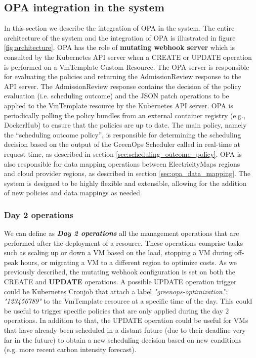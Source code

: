 \subsection{OPA integration in the system}

In this section we describe the integration of OPA in the system.
The entire architecture of the system and the integration of OPA is illustrated in figure \ref{fig:architecture}.
OPA has the role of \textbf{mutating webhook server} which is consulted by the Kubernetes API server when a CREATE or UPDATE operation is performed on a VmTemplate Custom Resource.
The OPA server is responsible for evaluating the policies and returning the AdmissionReview response to the API server.
The AdmissionReview response contains the decision of the policy evaluation (i.e. scheduling outcome) and the JSON patch operations to be applied to the VmTemplate resource by the Kubernetes API server.
OPA is periodically polling the policy bundles from an external container registry (e.g., DockerHub) to ensure that the policies are up to date.
The main policy, namely the ``scheduling outcome policy'', is responsible for determining the scheduling decision based on the output of the GreenOps Scheduler called in real-time at request time, as described in section \ref{sec:scheduling_outcome_policy}.
OPA is also responsible for data mapping operations between ElectricityMaps regions and cloud provider regions, as described in section \ref{sec:opa_data_mapping}.
The system is designed to be highly flexible and extensible, allowing for the addition of new policies and data mappings as needed.



\subsubsection{Day 2 operations}
\label{sec:day2_operations}

We can define as \textbf{\textit{Day 2 operations}} all the management operations that are performed after the deployment of a resource.
These operations comprise tasks such as scaling up or down a VM based on the load, stopping a VM during off-peak hours, or migrating a VM to a different region to optimize costs.
As we previously described, the mutating webhook configuration is set on both the CREATE and \textbf{UPDATE} operations.
A possible UPDATE operation trigger could be Kubernetes Cronjob that attach a label \textit{"greenops-optimization": "123456789"} to the VmTemplate resource at a specific time of the day.
This could be useful to trigger specific policies that are only applied during the day 2 operations.
In addition to that, the UPDATE operation could be useful for VMs that have already been scheduled in a distant future (due to their deadline very far in the future) to obtain a new scheduling decision based on new conditions (e.g. more recent carbon intensity forecast).

